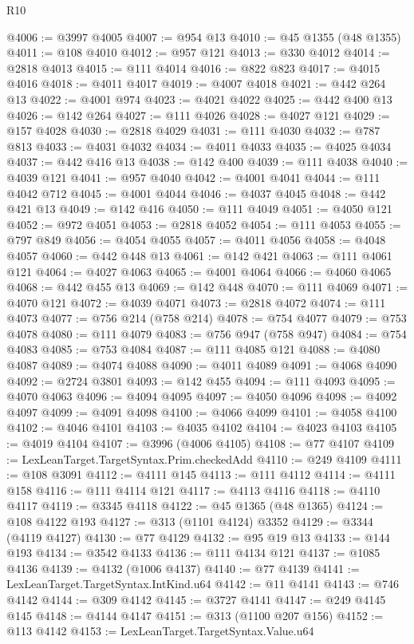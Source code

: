 \begin{lexlean}{R10}
\begin{coremodule}
{{{{{{{{{{{{{{{{{{{{{{{{{{{{{{{{{{{{{{{{{{{{{{{{{{{{{{{{{{{{{{{{{{{{{{{{{{{{{{{{{{{{{{{{{{{{{{{{{{{{{{{{{{{{@4006 := @3997 @4005
@4007 := @954 @13
@4010 := @45 @1355 (@48 @1355)
@4011 := @108 @4010
@4012 := @957 @121
@4013 := @330 @4012
@4014 := @2818 @4013
@4015 := @111 @4014
@4016 := @822 @823
@4017 := @4015 @4016
@4018 := @4011 @4017
@4019 := @4007 @4018
@4021 := @442 @264 @13
@4022 := @4001 @974
@4023 := @4021 @4022
@4025 := @442 @400 @13
@4026 := @142 @264
@4027 := @111 @4026
@4028 := @4027 @121
@4029 := @157 @4028
@4030 := @2818 @4029
@4031 := @111 @4030
@4032 := @787 @813
@4033 := @4031 @4032
@4034 := @4011 @4033
@4035 := @4025 @4034
@4037 := @442 @416 @13
@4038 := @142 @400
@4039 := @111 @4038
@4040 := @4039 @121
@4041 := @957 @4040
@4042 := @4001 @4041
@4044 := @111 @4042 @712
@4045 := @4001 @4044
@4046 := @4037 @4045
@4048 := @442 @421 @13
@4049 := @142 @416
@4050 := @111 @4049
@4051 := @4050 @121
@4052 := @972 @4051
@4053 := @2818 @4052
@4054 := @111 @4053
@4055 := @797 @849
@4056 := @4054 @4055
@4057 := @4011 @4056
@4058 := @4048 @4057
@4060 := @442 @448 @13
@4061 := @142 @421
@4063 := @111 @4061 @121
@4064 := @4027 @4063
@4065 := @4001 @4064
@4066 := @4060 @4065
@4068 := @442 @455 @13
@4069 := @142 @448
@4070 := @111 @4069
@4071 := @4070 @121
@4072 := @4039 @4071
@4073 := @2818 @4072
@4074 := @111 @4073
@4077 := @756 @214 (@758 @214)
@4078 := @754 @4077
@4079 := @753 @4078
@4080 := @111 @4079
@4083 := @756 @947 (@758 @947)
@4084 := @754 @4083
@4085 := @753 @4084
@4087 := @111 @4085 @121
@4088 := @4080 @4087
@4089 := @4074 @4088
@4090 := @4011 @4089
@4091 := @4068 @4090
@4092 := @2724 @3801
@4093 := @142 @455
@4094 := @111 @4093
@4095 := @4070 @4063
@4096 := @4094 @4095
@4097 := @4050 @4096
@4098 := @4092 @4097
@4099 := @4091 @4098
@4100 := @4066 @4099
@4101 := @4058 @4100
@4102 := @4046 @4101
@4103 := @4035 @4102
@4104 := @4023 @4103
@4105 := @4019 @4104
@4107 := @3996 (@4006 @4105)
@4108 := @77 @4107
@4109 := LexLeanTarget.TargetSyntax.Prim.checkedAdd
@4110 := @249 @4109
@4111 := @108 @3091
@4112 := @4111 @145
@4113 := @111 @4112
@4114 := @4111 @158
@4116 := @111 @4114 @121
@4117 := @4113 @4116
@4118 := @4110 @4117
@4119 := @3345 @4118
@4122 := @45 @1365 (@48 @1365)
@4124 := @108 @4122 @193
@4127 := @313 (@1101 @4124) @3352
@4129 := @3344 (@4119 @4127)
@4130 := @77 @4129
@4132 := @95 @19 @13
@4133 := @144 @193
@4134 := @3542 @4133
@4136 := @111 @4134 @121
@4137 := @1085 @4136
@4139 := @4132 (@1006 @4137)
@4140 := @77 @4139
@4141 := LexLeanTarget.TargetSyntax.IntKind.u64
@4142 := @11 @4141
@4143 := @746 @4142
@4144 := @309 @4142
@4145 := @3727 @4141
@4147 := @249 @4145 @145
@4148 := @4144 @4147
@4151 := @313 (@1100 @207 @156)
@4152 := @113 @4142
@4153 := LexLeanTarget.TargetSyntax.Value.u64
}}}}}}}}}}}}}}}}}}}}}}}}}}}}}}}}}}}}}}}}}}}}}}}}}}}}}}}}}}}}}}}}}}}}}}}}}}}}}}}}}}}}}}}}}}}}}}}}}}}}}}}}}}}}
\end{coremodule}
\end{lexlean}
